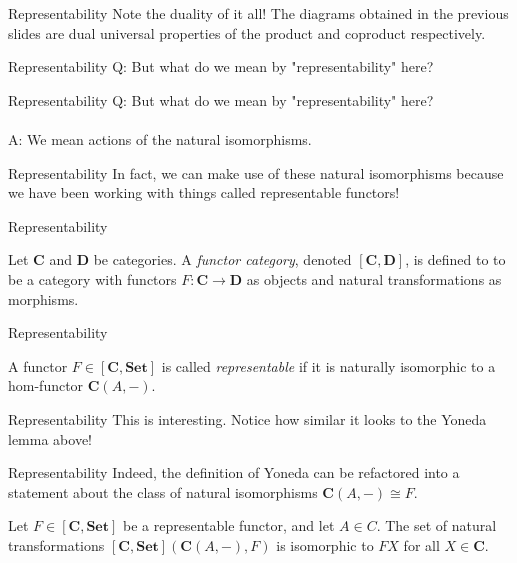 \documentclass[tikz]{beamer}
\theoremstyle{definition}
\begin{document}
\begin{frame}{Representability}
    Note the duality of it all! The diagrams obtained in the previous slides are dual universal properties of the product and coproduct respectively.
\end{frame}

\begin{frame}{Representability}
    Q: But what do we mean by "representability" here? 
\end{frame}{}

\begin{frame}{Representability}
    Q: But what do we mean by "representability" here? 
    \\
    \\
    A: We mean actions of the natural isomorphisms. 
\end{frame}{}

\begin{frame}{Representability}
    In fact, we can make use of these natural isomorphisms because we have been working with things called representable functors!
\end{frame}{}

\begin{frame}{Representability}
    \begin{definition}
        Let $\mathbf{C}$ and $\mathbf{D}$ be categories. A \textit{functor category}, denoted $[\mathbf{C}, \mathbf{D}]$, is defined to to be a category with functors $F: \mathbf{C} \to \mathbf{D}$ as objects and natural transformations as  morphisms. 
    \end{definition}{}
\end{frame}{}

\begin{frame}{Representability}
    \begin{definition}
        A functor $F \in [\mathbf{C}, \mathbf{Set}]$ is called \textit{representable} if it is naturally isomorphic to a hom-functor $\mathbf{C}(A,-)$.
    \end{definition}{}
\end{frame}{}

\begin{frame}{Representability}
    This is interesting. Notice how similar it looks to the Yoneda lemma above!
\end{frame}{}

\begin{frame}{Representability}
    Indeed, the definition of Yoneda can be refactored into a statement about the class of natural isomorphisms $\mathbf{C}(A,-) \cong F$.
    
    \begin{definition}
        Let $F \in [\mathbf{C}, \mathbf{Set}]$ be a representable functor, and let $A \in C$. The set of natural transformations $[\mathbf{C}, \mathbf{Set}](\mathbf{C}(A,-), F)$ is isomorphic to $FX$ for all $X \in \mathbf{C}$.

    \end{definition}{}
\end{frame}{}
\end{document}
